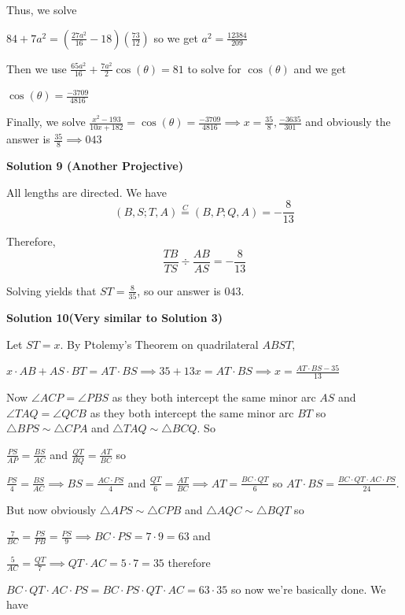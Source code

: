 \begin{enumerate}
 Thus, we solve

 $84 + 7a^2 = (\frac{27a^2}{16} - 18)(\frac{73}{12})$ so we get $a^2 = \frac{12384}{209}$

 Then we use $\frac{65a^2}{16} + \frac{7a^2}{2} \cos(\theta) = 81$ to solve for $\cos(\theta)$ and we get

 $\cos(\theta) = \frac{-3709}{4816}$

 Finally, we solve $\frac{x^2 - 193}{10x + 182} = \cos(\theta) = \frac{-3709}{4816} \implies x = \frac{35}{8}, \frac{-3635}{301}$ and obviously the answer is $\frac{35}{8} \implies \boxed{043}$




\textbf{Solution 9 (Another Projective)}

All lengths are directed. We have 
 \[(B, S; T, A) \stackrel{C}{=} (B,P; Q,A) = -\frac{8}{13}\]

 Therefore, 
 \[\frac{TB}{TS} \div \frac{AB}{AS} = -\frac{8}{13}\]

 Solving yields that $ST = \frac{8}{35}$, so our answer is $\boxed {043}$.

 



\textbf{Solution 10(Very similar to Solution 3)}

Let $ST = x$. By Ptolemy's Theorem on quadrilateral $ABST$,

 $x \cdot AB+AS \cdot BT=AT \cdot BS \implies 35+13x=AT \cdot BS \implies x=\frac{AT \cdot BS-35}{13}$

 Now $\angle ACP = \angle PBS$ as they both intercept the same minor arc $AS$ and $\angle TAQ = \angle QCB$ as they both intercept the same minor arc $BT$ so $\triangle BPS \sim \triangle CPA$ and $\triangle TAQ \sim \triangle BCQ$. So

 $\frac{PS}{AP} = \frac{BS}{AC}$ and $\frac{QT}{BQ} = \frac{AT}{BC}$ so

 $\frac{PS}{4} = \frac{BS}{AC} \implies BS = \frac{AC \cdot PS}{4}$ and $\frac{QT}{6} = \frac{AT}{BC} \implies AT = \frac{BC \cdot QT}{6}$ so $AT \cdot BS = \frac{BC \cdot QT \cdot AC \cdot PS}{24}$.

 But now obviously $\triangle APS \sim \triangle CPB$ and $\triangle AQC \sim \triangle BQT$ so

 $\frac{7}{BC} = \frac{PS}{PB} = \frac{PS}{9} \implies BC \cdot PS = 7 \cdot 9 = 63$ and

 $\frac{5}{AC} = \frac{QT}{7} \implies QT \cdot AC = 5 \cdot 7 = 35$ therefore

 $BC \cdot QT \cdot AC \cdot PS = BC \cdot PS \cdot QT \cdot AC = 63 \cdot 35$ so now we're basically done. We have


\end{enumerate}
